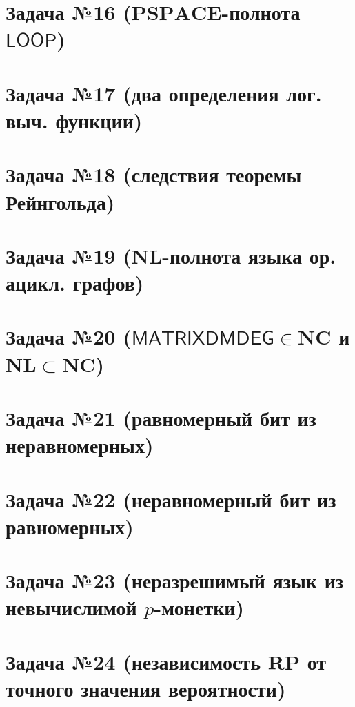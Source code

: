 \section{Задача №16 ($\mathbf{PSPACE}$-полнота $\mathsf{LOOP}$)}

\section{Задача №17 (два определения лог. выч. функции)}


\section{Задача №18 (следствия теоремы Рейнгольда)}


\section{Задача №19 ($\mathbf{NL}$-полнота языка ор. ацикл. графов)}


\section{Задача №20 ($\mathsf{MATRIXDMDEG} \in \mathbf{NC}$ и $\mathbf{NL} \subset \mathbf{NC}$)}


\section{Задача №21 (равномерный бит из неравномерных)}


\section{Задача №22 (неравномерный бит из равномерных)}


\section{Задача №23 (неразрешимый язык из невычислимой $p$-монетки)}


\section{Задача №24 (независимость $\mathbf{RP}$ от точного значения вероятности)}


